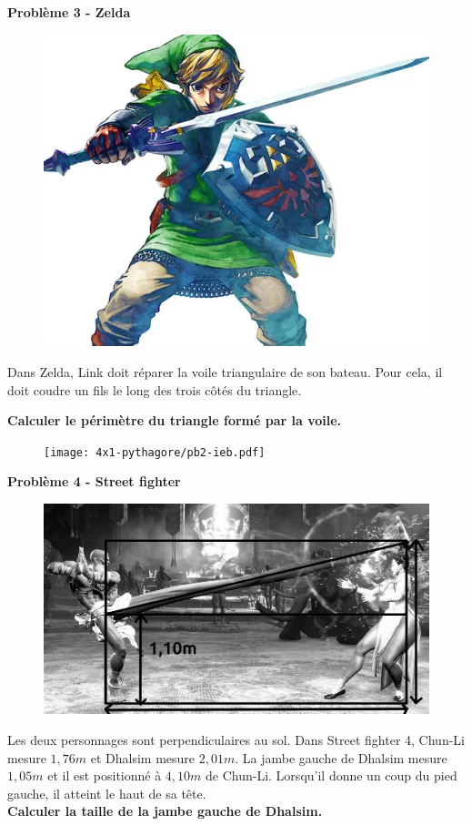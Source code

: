 \begin{multicols}{2} 
  \textbf{Problème 3 - Zelda} \\

  \begin{figure}[H]
    \centering
    \includegraphics[width=0.5\linewidth]{4x1-pythagore/pb1-link.png}
  \end{figure}

  Dans Zelda, Link doit réparer la voile triangulaire de son bateau. Pour cela, il doit coudre un fils le long des trois côtés du triangle. 

  \textbf{Calculer le périmètre du triangle formé par la voile.} \columnbreak

  \begin{figure}[H]
    \centering
    \texttt{[image: 4x1-pythagore/pb2-ieb.pdf]}
  \end{figure}

\end{multicols}


\textbf{Problème 4 - Street fighter} \\

\begin{figure}[H]
  \centering
  \includegraphics[width=0.5\linewidth]{4x1-pythagore/sf4.jpg}
\end{figure}

Les deux personnages sont perpendiculaires au sol. Dans Street fighter 4, Chun-Li mesure $1,76m$ et Dhalsim mesure $2,01m$. La jambe gauche de Dhalsim mesure $1,05m$ et il est positionné à $4,10m$ de Chun-Li. Lorsqu'il donne un coup du pied gauche, il atteint le haut de sa tête. \\

\textbf{Calculer la taille de la jambe gauche de Dhalsim.} 


